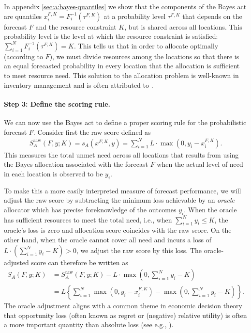 \documentclass{article}\usepackage[]{graphicx}\usepackage[]{xcolor}
\begin{document}
In appendix \ref{sec:a:bayes-quantiles} we show that the components of the Bayes act are quantiles 
$x_i^{F,K} = F_i^{-1}(\tau^{F,K})$ at a probability level $\tau^{F,K}$ that depends on the forecast $F$ and the resource
constraint $K$, but is shared across all locations. This probability level is the level at which the resource constraint
is satisfied: $\sum_{i=1}^N F_i^{-1}(\tau^{F,K}) = K$. This tells us that in order to allocate optimally (according to
$F$), we must divide resources among the locations so that there is an equal forecasted probability in every location
that the allocation is sufficient to meet resource need. This solution to the allocation problem is well-known in
inventory management and is often attributed to \cite{hadleywhitin1963}.

\paragraph{Step 3: Define the scoring rule.} We can now use the Bayes act to define a proper scoring rule for the
probabilistic forecast $F$. Consider first the raw score defined as
\begin{align}
  S_A^{\text{raw}}(F, y; K) = s_A(x^{F,K}, y) = \sum_{i=1}^N L \cdot \max(0, y_i - x_i^{F,K}).
\end{align}
This measures the total unmet need across all locations that results from using the Bayes allocation associated with the
forecast $F$ when the actual level of need in each location is observed to be $y_i$.

To make this a more easily interpreted measure of forecast performance, we will adjust the raw score by subtracting the
minimum loss achievable by an \emph{oracle} allocator which has precise foreknowledge of the outcomes $y_i$. When the
oracle has sufficient resources to meet the total need, i.e., when $\sum_{i=1}^{N}y_i \leq K$, the oracle's loss is zero
and allocation score coincides with the raw score. On the other hand, when the oracle cannot cover all need and incurs a
loss of $L \cdot \left(\sum_{i=1}^{N}y_i - K \right) > 0$, we adjust the raw score by this loss.
The oracle-adjusted score can therefore be written as
\begin{align}
  S_A(F, y; K)  &= S_A^{\text{raw}}(F, y; K) - L \cdot \max\left(0,\sum_{i=1}^{N}y_i - K\right) \\
  &= L\left\{\sum_{i=1}^N \max(0, y_i - x_i^{F,K}) -  \max\left(0,\sum_{i=1}^{N}y_i - K\right)\right\}.
\end{align}
The oracle adjustment aligns with a common theme in economic decision theory that opportunity loss (often known
as regret or (negative) relative utility) is often a more important quantity than absolute loss (see e.g.,
\cite{DIECIDUE201788}).
\end{document}
